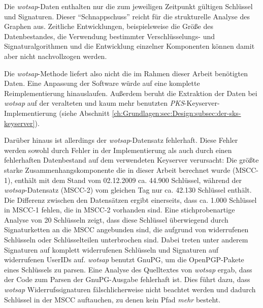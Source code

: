 Die \emph{wotsap}-Daten enthalten nur die zum jeweiligen Zeitpunkt
gültigen Schlüssel und Signaturen. Dieser "`Schnappschuss"' reicht für
die strukturelle Analyse des Graphen aus. Zeitliche Entwicklungen,
beispielsweise die Größe des Datenbestandes, die Verwendung
bestimmter Verschlüsselungs- und Signaturalgorithmen und die Entwicklung
einzelner Komponenten können damit aber nicht nachvollzogen werden.

Die \emph{wotsap}-Methode liefert also nicht die im Rahmen dieser
Arbeit benötigten Daten. Eine Anpassung der Software würde auf eine
komplette Reimplementierung hinauslaufen. Außerdem beruht die
Extraktion der Daten bei \emph{wotsap} auf der veralteten und kaum
mehr benutzten \emph{PKS}-Keyserver-Implementierung (siehe Abschnitt
\ref{ch:Grundlagen:sec:Design:subsec:der-sks-keyserver}).

Darüber hinaus ist allerdings der \emph{wotsap}-Datensatz
fehlerhaft. Diese Fehler werden sowohl durch Fehler in der
Implementierung als auch durch einen fehlerhaften Datenbestand auf dem
verwendeten Keyserver verursacht: Die größte starke
Zusammenhangskomponente die in dieser Arbeit berechnet wurde (MSCC-1),
enthält mit dem Stand vom 02.12.2009 ca. 44.900 Schlüssel, während der
\emph{wotsap}-Datensatz (MSCC-2) vom gleichen Tag nur ca. 42.130
Schlüssel enthält. Die Differenz zwischen den Datensätzen ergibt
einerseits, dass ca. 1.000 Schlüssel in MSCC-1 fehlen, die in MSCC-2
vorhanden sind. Eine stichprobenartige Analyse von 20 Schlüsseln
zeigt, dass diese Schlüssel überwiegend durch Signaturketten an die
MSCC angebunden sind, die aufgrund von widerrufenen Schlüsseln oder
Schlüsselteilen unterbrochen sind. Dabei treten unter anderem
Signaturen auf komplett widerrufenen Schlüsseln und Signaturen auf
widerrufenen UserIDs auf. \emph{wotsap} benutzt GnuPG, um die
OpenPGP-Pakete eines Schlüssels zu parsen. Eine Analyse des
Quelltextes von \emph{wotsap} ergab, dass der Code zum Parsen der
GnuPG-Ausgabe fehlerhaft ist. Dies führt dazu, dass \emph{wotsap}
Widerrufssignaturen fälschlicherweise nicht beachtet werden und
dadurch Schl\"ussel in der MSCC auftauchen, zu denen kein Pfad
\emph{mehr} besteht.

